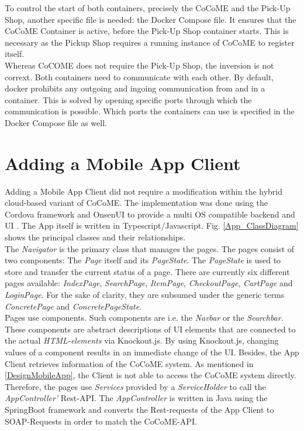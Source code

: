  	To control the start of both containers, precisely the CoCoME and the Pick-Up Shop, another specific file is needed: the Docker Compose file. It ensures that the CoCoME Container is active, before the Pick-Up Shop container starts. This is necessary as the Pickup Shop requires a running instance of CoCoME to register itself.\\
 	Whereas CoCOME does not require the Pick-Up Shop, the inversion is not corrext.
 	Both containers need to communicate with each other. By default, docker prohibits any outgoing and ingoing communication from and in a container. This is solved by opening specific ports through which the communication is possible. Which ports the containers can use is specified in the Docker Compose file as well.
 	
 	
 \section{Adding a Mobile App Client}\label{AppImplementation}
Adding a Mobile App Client did not require a modification within the hybrid cloud-based variant of CoCoME. The implementation was done using the Cordova framework and OnsenUI to provide a multi OS compatible backend and UI \cite{schnabel}. The App itself is written in Typescript/Javascript. Fig. \ref{App_ClassDiagram} shows the principal classes and their relationships.
\\
The \textit{Navigator} is the primary class that manages the pages. The pages consist of two components: The \textit{Page} itself and its \textit{PageState}. The \textit{PageState} is used to store and transfer the current status of a page. There are currently six different pages available: \textit{IndexPage}, \textit{SearchPage}, \textit{ItemPage}, \textit{CheckoutPage}, \textit{CartPage} and \textit{LoginPage}. For the sake of clarity, they are subsumed under the generic terms \textit{ConcretePage} and \textit{ConcretePageState}. 
\\
Pages use components. Such components are i.e. the \textit{Navbar} or the \textit{Searchbar}. These components are abstract descriptions of UI elements that are connected to the actual \textit{HTML-elements} via Knockout.js. By using Knockout.js, changing values of a component results in an immediate change of the UI. 
Besides, the App Client retrieves information of the CoCoME system.  As mentioned in \ref{DesignMobileApp}, the Client is not able to access the CoCoME system directly. Therefore, the pages use \textit{Services} provided by a \textit{ServiceHolder} to call the \textit{AppController'} Rest-API. The \textit{AppController} is written in Java using the SpringBoot framework and converts the Rest-requests of the App Client to SOAP-Requests in order to match the CoCoME-API. 
  

